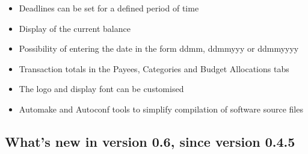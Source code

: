 \begin{itemize}
	\item Deadlines can be set for a defined period of time%
	\item Display of the current balance%
	\item Possibility of entering the date in the form ddmm, ddmmyyy or ddmmyyyy%
	\item Transaction totals in the Payees, Categories and Budget Allocations tabs%
	\item The logo and display font can be customised%
	\item Automake and Autoconf tools to simplify compilation of software source files%
\end{itemize}

\subsection{What's new in version 0.6, since version 0.4.5}

